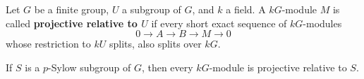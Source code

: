 \begin{definition}
\label{def:relative-projectivity}
Let $G$ be a finite group, $U$ a subgroup of $G$, and $k$ a field. A $kG$-module $M$ is called \textbf{projective relative to $U$} if every short exact sequence of $kG$-modules
$$
0 \longrightarrow A \longrightarrow B \longrightarrow M \longrightarrow 0
$$
whose restriction to $kU$ splits, also splits over $kG$.

If $S$ is a $p$-Sylow subgroup of $G$, then every $kG$-module is projective relative to $S$.
\end{definition}
